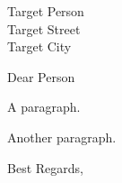 \documentclass[12pt]{letter}
\begin{document}
\address{My Street\\
         My City}

\signature{Who I Am\\ My Official Position}

\begin{letter}{Target Person \\
               Target Street \\
               Target City}

\opening{Dear Person}

A paragraph.

Another paragraph.


\closing{Best Regards,}
\end{letter}
\end{document}
